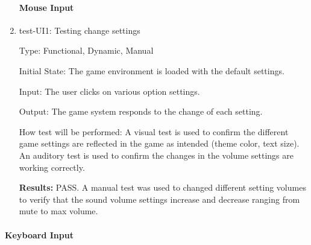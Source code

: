 \documentclass[12pt, titlepage]{article}
\begin{document}
\begin{enumerate}
\paragraph{Mouse Input}

\item{test-UI1: Testing change settings\\}


Type: Functional, Dynamic, Manual
					
Initial State: The game environment is loaded with the default settings.
					
Input: The user clicks on various option settings.
					
Output: The game system responds to the change of each setting.
					
How test will be performed: A visual test is used to confirm the different game settings are reflected in the game as intended (theme color, text size). An auditory test is used to confirm the changes in the volume settings are working correctly. 

\textbf{Results:} PASS. A manual test was used to changed different setting volumes to verify that the sound volume settings increase and decrease ranging from mute to max volume.

\end{enumerate}		
\paragraph{Keyboard Input}
\end{document}
